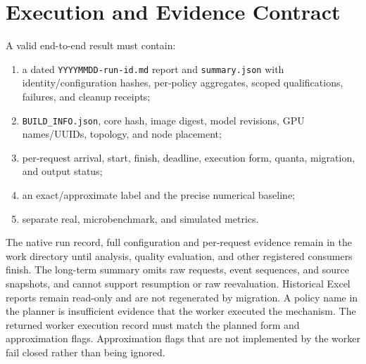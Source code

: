 \documentclass[11pt,a4paper]{article}
\begin{document}
\section{Execution and Evidence Contract}
A valid end-to-end result must contain:
\begin{enumerate}
  \item a dated \texttt{YYYYMMDD-run-id.md} report and
        \texttt{summary.json} with identity/configuration hashes, per-policy
        aggregates, scoped qualifications, failures, and cleanup receipts;
  \item \texttt{BUILD_INFO.json}, core hash, image digest, model revisions,
        GPU names/UUIDs, topology, and node placement;
  \item per-request arrival, start, finish, deadline, execution form, quanta,
        migration, and output status;
  \item an exact/approximate label and the precise numerical baseline;
  \item separate real, microbenchmark, and simulated metrics.
\end{enumerate}
The native run record, full configuration and per-request evidence remain in
the work directory until analysis, quality evaluation, and other registered
consumers finish. The long-term summary omits raw requests, event sequences,
and source snapshots, and cannot support resumption or raw reevaluation.
Historical Excel reports remain read-only and are not regenerated by migration.
A policy name in the planner is insufficient evidence that the worker executed
the mechanism. The returned worker execution record must match the planned
form and approximation flags. Approximation flags that are not implemented by
the worker fail closed rather than being ignored.
\end{document}
